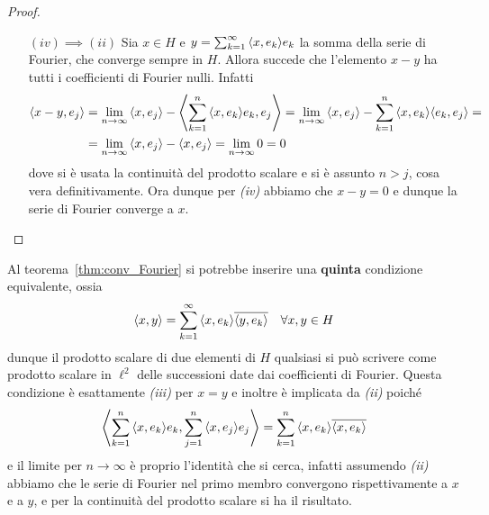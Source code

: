 \begin{proof}
\begin{enumerate}
    \item [\((iv) \implies (ii)\)] Sia \(x \in H\) e \(y = \sum_{k=1}^{\infty} {\left\langle x, e_{k}\right\rangle} e_{k} \)
    la somma della serie di Fourier, che converge sempre in \(H\). Allora
    succede che l'elemento \(x - y\) ha tutti i coefficienti di Fourier nulli.
    Infatti 
    \begin{align*}
        {\left\langle x - y, e_{j}\right\rangle} &= \lim_{n \to \infty} {\left\langle x, e_{j}\right\rangle} -
      {\left\langle\sum_{k=1}^{n} {\left\langle x, e_{k}\right\rangle} e_{k}, e_{j} \right\rangle} = \lim_{n \to \infty}
      {\left\langle x, e_{j}\right\rangle} - \sum_{k=1}^{n} {\left\langle x, e_{k}\right\rangle} {\left\langle e_{k}, e_{j}\right\rangle} = \\
                            &= \lim_{n \to \infty} {\left\langle x, e_{j}\right\rangle} - {\left\langle x,
                            e_{j}\right\rangle} = \lim_{n \to \infty} 0 = 0
    \end{align*}
    dove si è usata la continuità del prodotto scalare e si è assunto \(n > j\),
    cosa vera definitivamente. Ora dunque per \textit{(iv)} abbiamo che \(x - y
    = 0\) e dunque la serie di Fourier converge a \(x\). 
    \end{enumerate}
\end{proof}
\begin{remark}
    Al teorema~\ref{thm:conv_Fourier} si potrebbe inserire una
    \textbf{quinta} condizione equivalente, ossia
    \[
        {\left\langle x, y\right\rangle} = \sum_{k=1}^{\infty} {\left\langle x, e_{k}\right\rangle} \overline{{\left\langle y,
        e_{k}\right\rangle}}  \quad \forall x, y \in H
    \]
    dunque il prodotto scalare di due elementi di \(H\) qualsiasi si può
    scrivere come prodotto scalare in \(\ell^2\) delle successioni date dai
    coefficienti di Fourier. Questa condizione è esattamente
    \textit{(iii)} per \(x = y\) e inoltre è implicata da \textit{(ii)} poiché
    \[
      {\left\langle\sum_{k=1}^{n} {\left\langle x, e_{k}\right\rangle} e_{k} , \sum_{j=1}^{n} {\left\langle x,
              e_{j}\right\rangle} e_{j} \right\rangle} = \sum_{k=1}^{n} {\left\langle x, e_{k}\right\rangle} \overline{{\left\langle x,
      e_{k}\right\rangle}}
    \]
    e il limite per \(n \to \infty\) è proprio l'identità che si cerca, infatti
    assumendo \textit{(ii)} abbiamo che le serie di Fourier nel primo membro
    convergono rispettivamente a \(x\) e a \(y\), e per la continuità del
    prodotto scalare si ha il risultato.
\end{remark}

